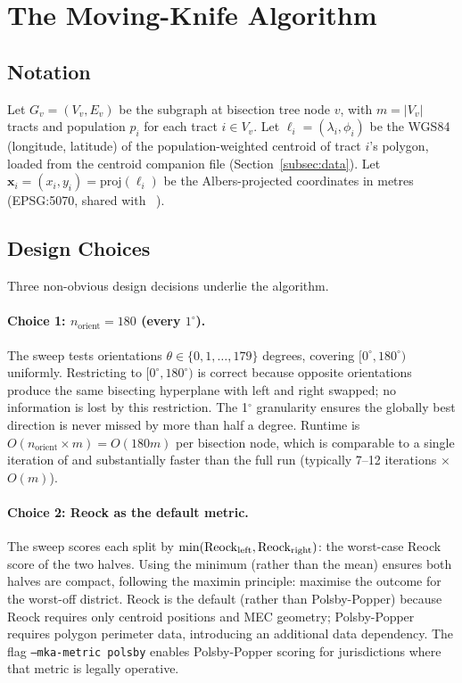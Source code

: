 \section{The Moving-Knife Algorithm}
\label{sec:algorithm}

\subsection{Notation}

Let $G_v = (V_v, E_v)$ be the subgraph at bisection tree node $v$, with
$m = |V_v|$ tracts and population $p_i$ for each tract $i \in V_v$.
Let $\ell_i = (\lambda_i, \phi_i)$ be the WGS84 (longitude, latitude) of
the population-weighted centroid of tract $i$'s polygon, loaded from the
centroid companion file (Section~\ref{subsec:data}).
Let $\mathbf{x}_i = (x_i, y_i) = \mathrm{proj}(\ell_i)$ be the
Albers-projected coordinates in metres (EPSG:5070, shared with
\cvdgeo{}~\citep{dellaLibera2026cvdgeo}).

\subsection{Design Choices}
\label{subsec:design}

Three non-obvious design decisions underlie the algorithm.

\paragraph{Choice 1: $n_{\mathrm{orient}} = 180$ (every $1^\circ$).}
The sweep tests orientations $\theta \in \{0, 1, \ldots, 179\}$ degrees,
covering $[0^\circ, 180^\circ)$ uniformly.
Restricting to $[0^\circ, 180^\circ)$ is correct because opposite
orientations produce the same bisecting hyperplane with left and right
swapped; no information is lost by this restriction.
The 1$^\circ$ granularity ensures the globally best direction is never
missed by more than half a degree.
Runtime is $O(n_{\mathrm{orient}} \times m) = O(180m)$ per bisection node,
which is comparable to a single iteration of \cvdgeo{} and substantially
faster than the full \cvdgeo{} run (typically 7--12 iterations $\times$ $O(m)$).

\paragraph{Choice 2: Reock as the default metric.}
The sweep scores each split by $\min(\mathrm{Reock}{}_{\mathrm{left}}, \mathrm{Reock}{}_{\mathrm{right}})$:
the worst-case Reock score of the two halves.
Using the minimum (rather than the mean) ensures both halves are compact,
following the maximin principle: maximise the outcome for the worst-off
district.
Reock is the default (rather than Polsby-Popper) because Reock requires only
centroid positions and MEC geometry; Polsby-Popper requires polygon perimeter
data, introducing an additional data dependency.
The flag \texttt{--mka-metric polsby} enables Polsby-Popper scoring for
jurisdictions where that metric is legally operative.

